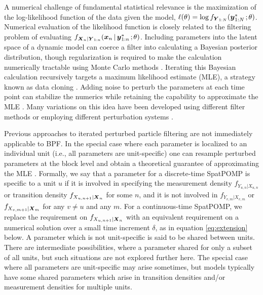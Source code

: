 \documentclass[12pt]{article}\usepackage[]{graphicx}\usepackage[]{xcolor}
\begin{document}
A numerical challenge of fundamental statistical relevance is the maximization of the log-likelihood function of the data given the model, $\ell(\theta)=\log f_{\boldsymbol{Y}_{1:N}}(\boldsymbol{y}^*_{1:N}{\hspace{0.5mm};\hspace{0.5mm}} \theta)$.
Numerical evaluation of the likelihood function is closely related to the filtering problem of evaluating $f_{\boldsymbol{X}_n|\boldsymbol{Y}_{1:n}}(\boldsymbol{x}_n{\,\vert\,} \boldsymbol{y}^*_{1:n}{\hspace{0.5mm};\hspace{0.5mm}} \theta)$.
Including parameters into the latent space of a dynamic model can coerce a filter into calculating a Bayesian posterior distribution, though regularization is required to make the calculation numerically tractable using Monte Carlo methods \citep{kitagawa98,janeliu01}.
Iterating this Bayesian calculation recursively targets a maximum likelihood estimate (MLE), a strategy known as data cloning \citep{lele07,lele10}.
Adding noise to perturb the parameters at each time point can stabilize the numerics while retaining the capability to approximate the MLE \citep{ionides06-pnas,ionides11,ionides15}.
Many variations on this idea have been developed using different filter methods \citep{park20,li20,ionides21,manoli15} or employing different perturbation systems \citep{doucet13,nguyen17}.

Previous approaches to iterated perturbed particle filtering are not immediately applicable to BPF.
In the special case where each parameter is localized to an individual unit (i.e., all parameters are unit-specific) one can resample perturbed parameters at the block level and obtain a theoretical guarantee of approximating the MLE \citep{ning21-ibpf}.
Formally, we say that a parameter for a discrete-time SpatPOMP is specific to a unit $u$ if it is involved in specifying the measurement density $f_{Y_{u,n}|X_{u,n}}$ or transition density $f_{X_{u,n+1}|\boldsymbol{X}_n}$ for some $n$, and it is not involved in $f_{Y_{v,m}|X_{v,m}}$ or $f_{X_{v,m+1}|\boldsymbol{X}_m}$ for any $v\neq u$ and any $m$.
For a continuous-time SpatPOMP, we replace the requirement on $f_{X_{u,n+1}|\boldsymbol{X}_n}$ with an equivalent requirement on a numerical solution over a small time increment $\delta$, as in equation \eqref{eq:extension} below.
A parameter which is not unit-specific is said to be shared between units.
There are intermediate possibilities, where a parameter shared for only a subset of all units, but such situations are not explored further here.
The special case where all parameters are unit-specific may arise sometimes, but models typically have some shared parameters which arise in transition densities and/or measurement densities for multiple units. 
\end{document}
